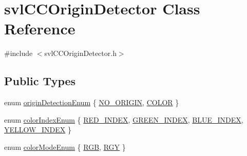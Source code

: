 \hypertarget{classsvl_c_c_origin_detector}{\section{svl\-C\-C\-Origin\-Detector Class Reference}
\label{classsvl_c_c_origin_detector}
}


{\ttfamily \#include $<$svl\-C\-C\-Origin\-Detector.\-h$>$}

\subsection*{Public Types}
\begin{DoxyCompactItemize}
\item 
enum \hyperlink{classsvl_c_c_origin_detector_a829919c0137fee858082813a13e4f1c9}{origin\-Detection\-Enum} \{ \hyperlink{classsvl_c_c_origin_detector_a829919c0137fee858082813a13e4f1c9a5220f69dc8766b2177ce9ab496d9de63}{N\-O\-\_\-\-O\-R\-I\-G\-I\-N}, 
\hyperlink{classsvl_c_c_origin_detector_a829919c0137fee858082813a13e4f1c9a6fde1af1e5eeec03d469cec2b080475e}{C\-O\-L\-O\-R}
 \}
\item 
enum \hyperlink{classsvl_c_c_origin_detector_a1e4dabe83f94a0b1b889ecf59b3c86e5}{color\-Index\-Enum} \{ \hyperlink{classsvl_c_c_origin_detector_a1e4dabe83f94a0b1b889ecf59b3c86e5aaed058a0c0019238f8348aa1de10402d}{R\-E\-D\-\_\-\-I\-N\-D\-E\-X}, 
\hyperlink{classsvl_c_c_origin_detector_a1e4dabe83f94a0b1b889ecf59b3c86e5a3b46564a343cde474a62d50161f7f2ac}{G\-R\-E\-E\-N\-\_\-\-I\-N\-D\-E\-X}, 
\hyperlink{classsvl_c_c_origin_detector_a1e4dabe83f94a0b1b889ecf59b3c86e5a48b2b34325cf4da5422b6b94c9cf2664}{B\-L\-U\-E\-\_\-\-I\-N\-D\-E\-X}, 
\hyperlink{classsvl_c_c_origin_detector_a1e4dabe83f94a0b1b889ecf59b3c86e5a53b8ba560b7d7695a23a1e9395fae7fa}{Y\-E\-L\-L\-O\-W\-\_\-\-I\-N\-D\-E\-X}
 \}
\item 
enum \hyperlink{classsvl_c_c_origin_detector_abc46027473187db71ca84294e3df9554}{color\-Mode\-Enum} \{ \hyperlink{classsvl_c_c_origin_detector_abc46027473187db71ca84294e3df9554a6776e828a188248094522bf3420db2d2}{R\-G\-B}, 
\hyperlink{classsvl_c_c_origin_detector_abc46027473187db71ca84294e3df9554a9cf1aba344d3244ebdbb4de099f3c181}{R\-G\-Y}
 \}
\end{DoxyCompactItemize}
